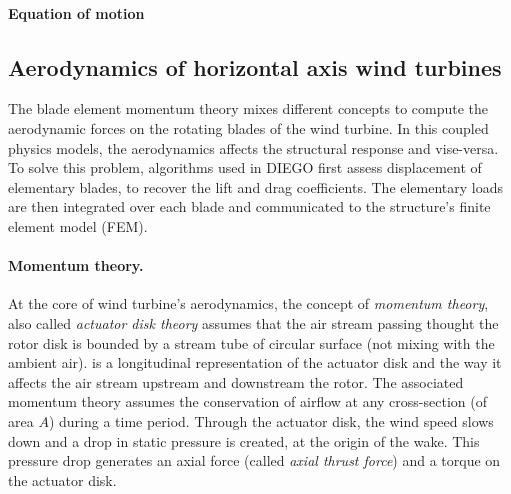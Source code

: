 \paragraph{Equation of motion}



\subsection{Aerodynamics of horizontal axis wind turbines}

The blade element momentum theory mixes different concepts to compute the aerodynamic forces on the rotating blades of the wind turbine.
In this coupled physics models, the aerodynamics affects the structural response and vise-versa. 
To solve this problem, algorithms used in DIEGO first assess displacement of elementary blades, to recover the lift and drag coefficients. 
The elementary loads are then integrated over each blade and communicated to the structure's finite element model (FEM).


\paragraph{Momentum theory.}
At the core of wind turbine's aerodynamics, the concept of \textit{momentum theory}, also called \textit{actuator disk theory} assumes that the air stream passing thought the rotor disk is bounded by a stream tube of circular surface (not mixing with the ambient air). 
 is a longitudinal representation of the actuator disk and the way it affects the air stream upstream and downstream the rotor. 
The associated momentum theory assumes the conservation of airflow at any cross-section (of area $A$) during a time period. 
Through the actuator disk, the wind speed slows down and a drop in static pressure is created, at the origin of the wake. 
This pressure drop generates an axial force (called \textit{axial thrust force}) and a torque on the actuator disk.

